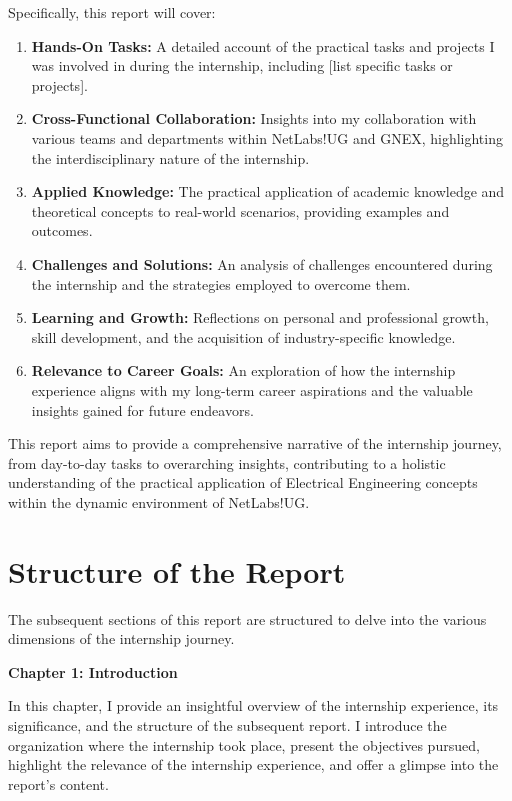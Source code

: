 Specifically, this report will cover:
\begin{enumerate}
    \item \textbf{Hands-On Tasks:} A detailed account of the practical tasks and projects I was involved in during the internship, including [list specific tasks or projects].
    \item \textbf{Cross-Functional Collaboration:} Insights into my collaboration with various teams and departments within NetLabs!UG and GNEX, highlighting the interdisciplinary nature of the internship.
    \item \textbf{Applied Knowledge:} The practical application of academic knowledge and theoretical concepts to real-world scenarios, providing examples and outcomes.
    \item \textbf{Challenges and Solutions:} An analysis of challenges encountered during the internship and the strategies employed to overcome them.
    \item \textbf{Learning and Growth:} Reflections on personal and professional growth, skill development, and the acquisition of industry-specific knowledge.
    \item \textbf{Relevance to Career Goals:} An exploration of how the internship experience aligns with my long-term career aspirations and the valuable insights gained for future endeavors.
\end{enumerate}
This report aims to provide a comprehensive narrative of the internship journey, from day-to-day tasks to overarching insights, contributing to a holistic understanding of the practical application of Electrical Engineering concepts within the dynamic environment of NetLabs!UG.

\section{Structure of the Report}

The subsequent sections of this report are structured to delve into the various dimensions of the internship journey.

\textbf{Chapter 1: Introduction}

In this chapter, I provide an insightful overview of the internship experience, its significance, and the structure of the subsequent report. I introduce the organization where the internship took place, present the objectives pursued, highlight the relevance of the internship experience, and offer a glimpse into the report's content.

